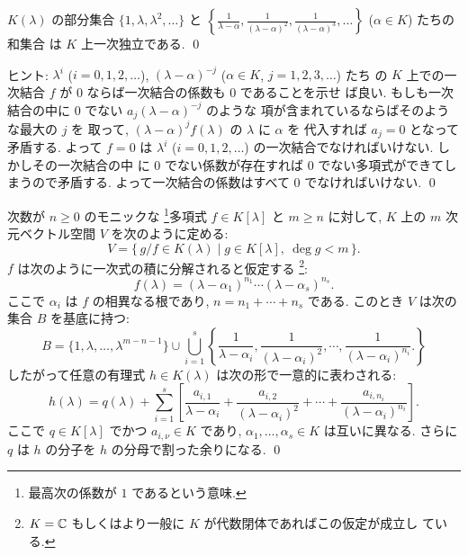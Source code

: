\documentclass[12pt,twoside]{jarticle}
\begin{document}

\begin{question}
\label{q:partial-fraction-1}
  $K(\lambda)$ の部分集合 $\{1,\lambda,\lambda^2,\ldots\}$ 
  と $\left\{\frac{1}{\lambda-\alpha}, \frac{1}{(\lambda-\alpha)^2}, 
    \frac{1}{(\lambda-\alpha)^3},\ldots\right\}$ ($\alpha\in K$) たちの和集合
  は $K$ 上一次独立である. \qed
\end{question}

\noindent
ヒント: $\lambda^i$ ($i=0,1,2,\dots$), 
$(\lambda-\alpha)^{-j}$ ($\alpha\in K$, $j=1,2,3,\dots$) たち
の $K$ 上での一次結合 $f$ が $0$ ならば一次結合の係数も $0$ であることを示せ
ば良い.  もしも一次結合の中に $0$ でない $a_j(\lambda-\alpha)^{-j}$ のような
項が含まれているならばそのような最大の $j$ を
取って, $(\lambda-\alpha)^jf(\lambda)$ の $\lambda$ に $\alpha$ を
代入すれば $a_j=0$ となって矛盾する.  よって $f=0$ は $\lambda^i$
($i=0,1,2,\dots$) の一次結合でなければいけない.  しかしその一次結合の中
に $0$ でない係数が存在すれば $0$ でない多項式ができてしまうので矛盾する. 
よって一次結合の係数はすべて $0$ でなければいけない.
\qed


\begin{question}[有理函数の部分分数展開]
\label{q:partial-fraction-2}
  次数が $n\ge0$ のモニックな%
  \footnote{最高次の係数が $1$ であるという意味.}多項式 $f\in K[\lambda]$ 
  と $m\ge n$ に対して, $K$ 上の $m$ 次元ベクトル空間 $V$ を次のように定める:
  \begin{equation*}
    V = \{\, g/f \in K(\lambda) \mid g\in K[\lambda],\ \deg g < m\,\}.
  \end{equation*}
  $f$ は次のように一次式の積に分解されると仮定する%
  \footnote{$K={\mathbb C}$ もしくはより一般に $K$ が代数閉体であればこの仮定が成立し
    ている.}:
  \begin{equation*}
    f(\lambda) = (\lambda-\alpha_1)^{n_1}\cdots(\lambda-\alpha_s)^{n_s}.
  \end{equation*}
  ここで $\alpha_i$ は $f$ の相異なる根であり, $n=n_1+\cdots+n_s$ である.
  このとき $V$ は次の集合 $B$ を基底に持つ: 
  \begin{equation*}
    B = 
    \{1,\lambda,\dots,\lambda^{m-n-1}\}
    \cup
    \bigcup_{i=1}^s
    \left\{
      \frac{1}{\lambda-\alpha_i},
      \frac{1}{(\lambda-\alpha_i)^2},
      \cdots,
      \frac{1}{(\lambda-\alpha_i)^{n_i}}.
    \right\}
  \end{equation*}
  したがって任意の有理式 $h\in K(\lambda)$ は次の形で一意的に表わされる:
  \begin{equation*}
    h(\lambda)
    = q(\lambda) 
    + \sum_{i=1}^s
    \left[
      \frac{a_{i,1}}{\lambda-\alpha_i} +
      \frac{a_{i,2}}{(\lambda-\alpha_i)^2} + \cdots +
      \frac{a_{i,n_i}}{(\lambda-\alpha_i)^{n_i}}
    \right].
  \end{equation*}
  ここで $q\in K[\lambda]$ でかつ $a_{i,\nu}\in K$ であり,
  $\alpha_1,\dots,\alpha_s\in K$ は互いに異なる.
  さらに $q$ は $h$ の分子を $h$ の分母で割った余りになる.
  \qed
\end{question}
\end{document}
